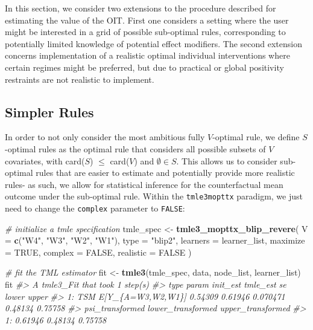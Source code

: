 \documentclass[12pt, krantz2,]{book}
\newenvironment{Shaded}{\begin{snugshade}}{\end{snugshade}}
\newcommand{\CommentTok}[1]{\textcolor[rgb]{0.56,0.35,0.01}{\textit{#1}}}
\newcommand{\DataTypeTok}[1]{\textcolor[rgb]{0.13,0.29,0.53}{#1}}
\newcommand{\KeywordTok}[1]{\textcolor[rgb]{0.13,0.29,0.53}{\textbf{#1}}}
\newcommand{\NormalTok}[1]{#1}
\newcommand{\OtherTok}[1]{\textcolor[rgb]{0.56,0.35,0.01}{#1}}
\newcommand{\StringTok}[1]{\textcolor[rgb]{0.31,0.60,0.02}{#1}}
\theoremstyle{definition}
\theoremstyle{definition}
\theoremstyle{definition}
\newcommand{\1}{\mathbbm{1}}
\begin{document}
In this section, we consider two extensions to the procedure described for
estimating the value of the OIT. First one considers a setting where the user
might be interested in a grid of possible sub-optimal rules, corresponding to
potentially limited knowledge of potential effect modifiers. The second
extension concerns implementation of a realistic optimal individual
interventions where certain regimes might be preferred, but due to practical or
global positivity restraints are not realistic to implement.

\hypertarget{simpler-rules}{%
\subsection{Simpler Rules}\label{simpler-rules}}

In order to not only consider the most ambitious fully \(V\)-optimal rule, we
define \(S\)-optimal rules as the optimal rule that considers all possible subsets
of \(V\) covariates, with card(\(S\)) \(\leq\) card(\(V\)) and \(\emptyset \in S\). This
allows us to consider sub-optimal rules that are easier to estimate and
potentially provide more realistic rules- as such, we allow for statistical
inference for the counterfactual mean outcome under the sub-optimal rule.
Within the \texttt{tmle3mopttx} paradigm, we just need to change the \texttt{complex}
parameter to \texttt{FALSE}:

\begin{Shaded}
\begin{Highlighting}[]
\CommentTok{# initialize a tmle specification}
\NormalTok{tmle_spec <-}\StringTok{ }\KeywordTok{tmle3_mopttx_blip_revere}\NormalTok{(}
  \DataTypeTok{V =} \KeywordTok{c}\NormalTok{(}\StringTok{"W4"}\NormalTok{, }\StringTok{"W3"}\NormalTok{, }\StringTok{"W2"}\NormalTok{, }\StringTok{"W1"}\NormalTok{), }\DataTypeTok{type =} \StringTok{"blip2"}\NormalTok{,}
  \DataTypeTok{learners =}\NormalTok{ learner_list,}
  \DataTypeTok{maximize =} \OtherTok{TRUE}\NormalTok{, }\DataTypeTok{complex =} \OtherTok{FALSE}\NormalTok{, }\DataTypeTok{realistic =} \OtherTok{FALSE}
\NormalTok{)}
\end{Highlighting}
\end{Shaded}

\begin{Shaded}
\begin{Highlighting}[]
\CommentTok{# fit the TML estimator}
\NormalTok{fit <-}\StringTok{ }\KeywordTok{tmle3}\NormalTok{(tmle_spec, data, node_list, learner_list)}
\NormalTok{fit}
\CommentTok{#> A tmle3_Fit that took 1 step(s)}
\CommentTok{#>    type             param init_est tmle_est       se   lower   upper}
\CommentTok{#> 1:  TSM E[Y_\{A=W3,W2,W1\}]  0.54309  0.61946 0.070471 0.48134 0.75758}
\CommentTok{#>    psi_transformed lower_transformed upper_transformed}
\CommentTok{#> 1:         0.61946           0.48134           0.75758}
\end{Highlighting}
\end{Shaded}
\end{document}
